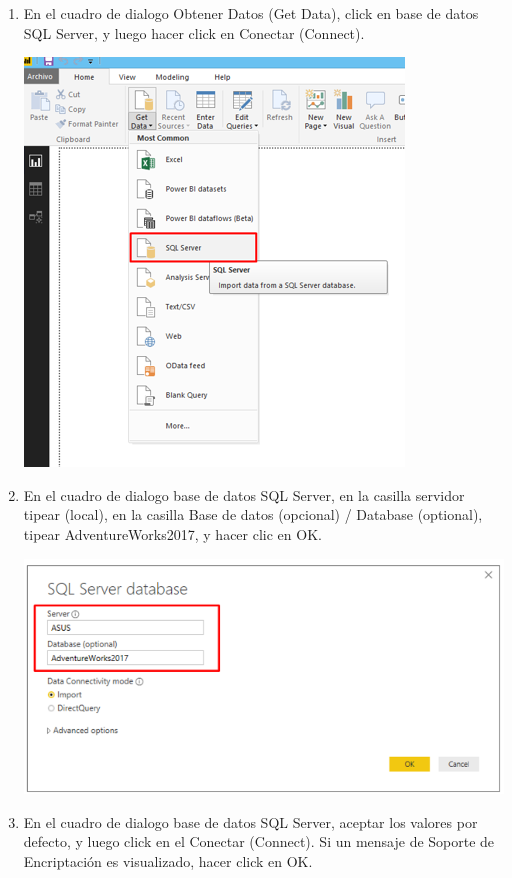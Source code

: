 \begin{itemize}
\begin{enumerate}
\item En el cuadro de dialogo Obtener Datos (Get Data), click en base de datos SQL Server, y luego hacer click en Conectar (Connect).

\begin{center}
\includegraphics[scale=0.55]{./Imagenes/a3.png}
\end{center}


\item En el cuadro de dialogo base de datos SQL Server, en la casilla servidor tipear (local), en la casilla Base de datos (opcional) / Database (optional), tipear AdventureWorks2017, y hacer clic en OK.

\begin{center}
\includegraphics[scale=0.55]{./Imagenes/a4.png}
\end{center}

\item En el cuadro de dialogo base de datos SQL Server, aceptar los valores por defecto, y luego click en el Conectar (Connect). Si un mensaje de Soporte de Encriptación es visualizado, hacer click en OK.


\end{enumerate}
\end{itemize}
